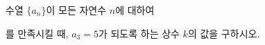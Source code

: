 수열 $\{a_n\}$이 모든 자연수 $n$에 대하여 \par\smallskip{}\par\smallskip\noindent 를 만족시킬 때, $a_3=5$가 되도록 하는 상수 $k$의 값을 구하시오.
